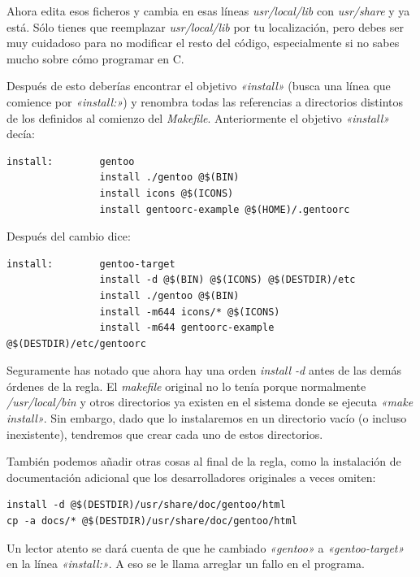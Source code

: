 \documentclass[letterpaper,12pt,spanish]{manual}
\begin{document}
Ahora edita esos ficheros y cambia en esas líneas \emph{usr/local/lib} con \emph{usr/share} y ya está. Sólo tienes que reemplazar \emph{usr/local/lib} por tu localización, pero debes ser muy cuidadoso para no modificar el resto del código, especialmente si no sabes mucho sobre cómo programar en C.

Después de esto deberías encontrar el objetivo \emph{«install»} (busca una línea que comience por \emph{«install:»}) y renombra todas las referencias a directorios distintos de los definidos al comienzo del \emph{Makefile}. Anteriormente el objetivo \emph{«install»} decía:

\begin{Verbatim}[commandchars=@\[\]]
install:        gentoo
                install ./gentoo @$(BIN)
                install icons @$(ICONS)
                install gentoorc-example @$(HOME)/.gentoorc
\end{Verbatim}

Después del cambio dice:

\begin{Verbatim}[commandchars=@\[\]]
install:        gentoo-target
                install -d @$(BIN) @$(ICONS) @$(DESTDIR)/etc
                install ./gentoo @$(BIN)
                install -m644 icons/* @$(ICONS)
                install -m644 gentoorc-example @$(DESTDIR)/etc/gentoorc
\end{Verbatim}

Seguramente has notado que ahora hay una orden \emph{install -d} antes de las demás órdenes de la regla. El \emph{makefile} original no lo tenía porque normalmente \emph{/usr/local/bin} y otros directorios ya existen en el sistema donde se ejecuta \emph{«make install»}. Sin embargo, dado que lo instalaremos en un directorio vacío (o incluso inexistente), tendremos que crear cada uno de estos directorios.

También podemos añadir otras cosas al final de la regla, como la instalación de documentación adicional que los desarrolladores originales a veces omiten:

\begin{Verbatim}[commandchars=@\[\]]
install -d @$(DESTDIR)/usr/share/doc/gentoo/html
cp -a docs/* @$(DESTDIR)/usr/share/doc/gentoo/html
\end{Verbatim}

Un lector atento se dará cuenta de que he cambiado \emph{«gentoo»} a \emph{«gentoo-target»} en la línea \emph{«install:»}. A eso se le llama arreglar un fallo en el programa.
\end{document}
